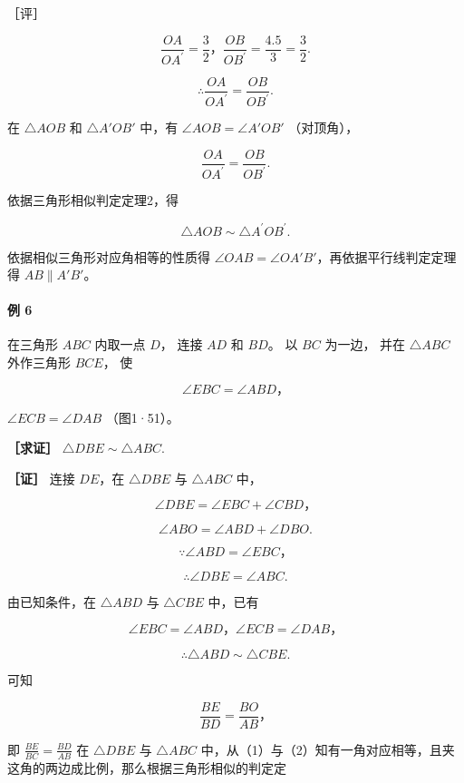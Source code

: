 ［评］

\[
\frac {O A}{O A ^ {\prime}} = \frac {3}{2}\text{，} \frac {O B}{O B ^ {\prime}} = \frac {4. 5}{3} = \frac {3}{2}.
\]

\[
\therefore \frac {O A}{O A ^ {\prime}} = \frac {O B}{O B ^ {\prime}}.
\]

在 \(\triangle AOB\) 和 \(\triangle A'OB'\) 中，有
\(\angle AOB = \angle A'OB'\) （对顶角），

\[
\frac {O A}{O A ^ {\prime}} = \frac {O B}{O B ^ {\prime}}.
\]

依据三角形相似判定定理2，得

\[
\triangle A O B \sim \triangle A ^ {\prime} O B ^ {\prime}.
\]

依据相似三角形对应角相等的性质得
\(\angle OAB = \angle OA'B'\)，再依据平行线判定定理得
\(AB \parallel A'B'\)。

\paragraph{例 6}

在三角形 \(ABC\) 内取一点 \(D\)， 连接 \(AD\) 和 \(BD\)。 以 \(BC\)
为一边， 并在 \(\triangle ABC\) 外作三角形 \(BCE\)， 使

\[
\angle E B C = \angle A B D\text{，}
\]

\(\angle ECB = \angle DAB\) （图1·51）。

\textbf{［求证］} \(\triangle DBE\sim \triangle ABC.\)

\textbf{［证］} 连接 \(DE\)，在 \(\triangle DBE\) 与 \(\triangle ABC\)
中，

\[
\angle D B E = \angle E B C + \angle C B D\text{，}
\]

\[
\angle A B O = \angle A B D + \angle D B O.
\]

\[
\because \angle A B D = \angle E B C\text{，}
\]

\[
\therefore \angle D B E = \angle A B C.
\]

由已知条件，在 \(\triangle ABD\) 与 \(\triangle CBE\) 中，已有

\[
\angle E B C = \angle A B D\text{，} \angle E C B = \angle D A B\text{，}
\]

\[
\therefore \triangle A B D \sim \triangle C B E.
\]

可知

\[
\frac {B E}{B D} = \frac {B O}{A B}\text{，} \tag {2}
\]

即 \(\frac{BE}{BC} = \frac{BD}{AB}\) 在 \(\triangle DBE\) 与
\(\triangle ABC\)
中，从（1）与（2）知有一角对应相等，且夹这角的两边成比例，那么根据三角形相似的判定定

